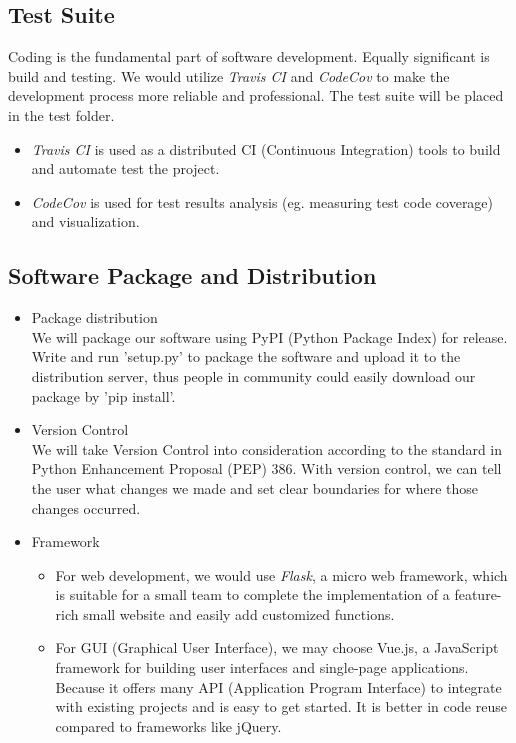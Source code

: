 \subsection{Test Suite}
Coding is the fundamental part of software development. Equally significant is build and testing. We would utilize \emph{Travis CI} and \emph{CodeCov} to make the development process more reliable and professional. The test suite will be placed in the test folder.
\begin{itemize}
    \item \emph{Travis CI} is used as a distributed CI (Continuous Integration) tools to build and automate test the project.
    \item \emph{CodeCov} is used for test results analysis (eg. measuring test code coverage) and visualization.
\end{itemize}
 

\subsection{Software Package and Distribution}
\begin{itemize}
    \item  Package distribution\\
    We will package our software using PyPI (Python Package Index) for release. 
    Write and run 'setup.py' to package the software and upload it to the distribution server, thus people in community could easily download our package by 'pip install'.
    \item Version Control\\
    We will take Version Control into consideration according to the standard in Python Enhancement Proposal (PEP) 386. With version control, we can tell the user what changes we made and set clear boundaries for where those changes occurred.
    \item Framework
    \begin{itemize}
        \item For web development, we would use \emph{Flask}, a micro web framework, which is suitable for a small team to complete the implementation of a feature-rich small website and easily add customized functions.
        \item For GUI (Graphical User Interface), we may choose Vue.js, a JavaScript framework for building user interfaces and single-page applications. Because it offers many API (Application Program Interface) to integrate with existing projects and is easy to get started. It is better in code reuse compared to frameworks like jQuery.

    \end{itemize}
    
    
\end{itemize}





